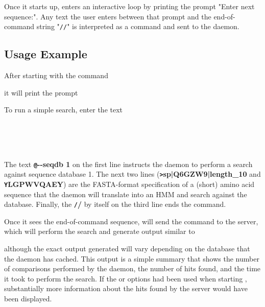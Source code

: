 \documentclass[notoc,justified]{tufte-book}    %
\begin{document}
Once it starts up,  enters an interactive loop by printing the prompt "Enter next sequence:".  Any text the user enters between that prompt and the end-of-command string "{\tt //}" is interpreted as a command and sent to the daemon.  

\subsection{Usage Example}
After starting  with the command

\vspace{1ex}
\vspace{1ex}

it will print the prompt

 \vspace{-1ex}
 \vspace{-1ex}

To run a simple search, enter the text

\vspace{1ex}
 \\
 \\
 \\
\user{//}
\vspace{1ex}

The text {\small\bfseries\texttt @-{}-seqdb 1} on the first line instructs the daemon to perform a search against sequence database 1. The next two lines ({\small\bfseries\texttt >sp|Q6GZW9|length\_10} and {\small\bfseries\texttt YLGPWVQAEY}) are the FASTA-format specification of a (short) amino acid sequence that the daemon will translate into an HMM and search against the database.  Finally, the 
{\small\bfseries\texttt //} by itself on the third line ends the command.  

Once it sees the end-of-command sequence,  will send the command to the server, which will perform the search and generate output similar to

\vspace{-1ex}
 \vspace{-1ex}

 although the exact output generated will vary depending on the database that the daemon has cached.  This output is a simple summary that shows the number of comparisons performed by the daemon, the number of hits found, and the time it took to perform the search.  If the  or  options had been used when starting , substantially more information about the hits found by the server would have been displayed.
\end{document}
